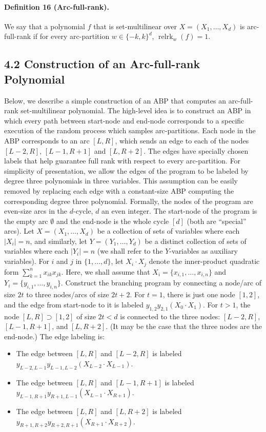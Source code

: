 \documentclass[10pt,a4paper]{article}
\begin{document}
\paragraph{Definition 16 (Arc-full-rank).} We say that a polynomial $f$ that is set-multilinear over $X=(X_1,\ldots,X_d)$ is arc-full-rank if for every arc-partition $w\in\{-k,k\}^d$, $\operatorname{relrk}_w(f)=1$.
\subsection*{4.2 Construction of an Arc-full-rank Polynomial}
Below, we describe a simple construction of an ABP that computes an arc-full-rank set-multilinear polynomial. The high-level idea is to construct an ABP in which every path between start-node and end-node corresponds to a specific execution of the random process which samples arc-partitions. Each node in the ABP corresponds to an arc $[L,R]$, which sends an edge to each of the nodes $[L-2,R]$, $[L-1,R+1]$ and $[L,R+2]$. The edges have specially chosen labels that help guarantee full rank with respect to every arc-partition. For simplicity of presentation, we allow the edges of the program to be labeled by degree three polynomials in three variables. This assumption can be easily removed by replacing each edge with a constant-size ABP computing the corresponding degree three polynomial.
Formally, the nodes of the program are even-size arcs in the $d$-cycle, $d$ an even integer. The start-node of the program is the empty arc $\emptyset$ and the end-node is the whole cycle $[d]$ (both are ``special'' arcs). Let $X=(X_1,\ldots,X_d)$ be a collection of sets of variables where each $|X_i|=n$, and similarly, let $Y=(Y_1,\ldots,Y_d)$ be a distinct collection of sets of variables where each $|Y_i|=n$ (we shall refer to the $Y$-variables as auxiliary variables). For $i$ and $j$ in $\{1,\ldots,d\}$, let $X_i\cdot X_j$ denote the inner-product quadratic form $\sum_{k=1}^n x_{ik}x_{jk}$. Here, we shall assume that $X_i=\{x_{i,1},\ldots,x_{i,n}\}$ and $Y_i=\{y_{i,1},\ldots,y_{i,n}\}$.
Construct the branching program by connecting a node/arc of size $2t$ to three nodes/arcs of size $2t+2$. For $t=1$, there is just one node $[1,2]$, and the edge from start-node to it is labeled $y_{1,2}y_{2,1}(X_0\cdot X_1)$. For $t>1$, the node $[L,R]\supset[1,2]$ of size $2t<d$ is connected to the three nodes: $[L-2,R]$, $[L-1,R+1]$, and $[L,R+2]$. (It may be the case that the three nodes are the end-node.) The edge labeling is:
\begin{itemize}
\item The edge between $[L,R]$ and $[L-2,R]$ is labeled $y_{L-2,L-1}y_{L-1,L-2}(X_{L-2}\cdot X_{L-1})$.
\item The edge between $[L,R]$ and $[L-1,R+1]$ is labeled $y_{L-1,R+1}y_{R+1,L-1}(X_{L-1}\cdot X_{R+1})$.
\item The edge between $[L,R]$ and $[L,R+2]$ is labeled $y_{R+1,R+2}y_{R+2,R+1}(X_{R+1}\cdot X_{R+2})$.
\end{itemize}
\end{document}
